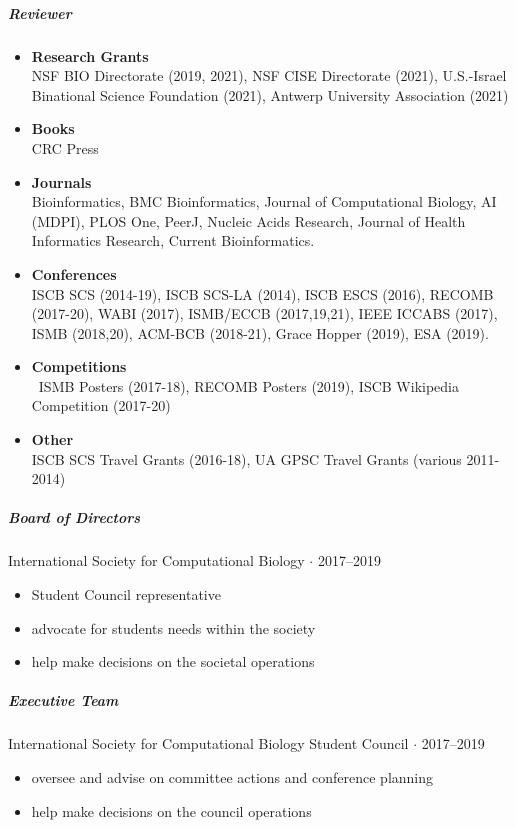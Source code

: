 \documentclass[10pt,letterpaper]{article}
\newcommand{\bigdot}{$\cdot$\xspace}
\begin{document}
\subparagraph{Reviewer} 
\begin{itemize}[leftmargin=!,labelindent=5pt,itemindent=-15pt]
    \item \textbf{Research Grants} \\ 
    	NSF BIO Directorate (2019, 2021), 
    	NSF CISE Directorate (2021), 
	U.S.-Israel Binational Science Foundation (2021), 
	Antwerp University Association (2021)
    \item \textbf{Books} \\
    	CRC Press
    \item \textbf{Journals} \\
        Bioinformatics,
        BMC Bioinformatics, 
        Journal of Computational Biology,
        AI (MDPI), 
        PLOS One, 
        PeerJ, 
        Nucleic Acids Research, 
        Journal of Health Informatics Research,
        Current Bioinformatics.
    \item \textbf{Conferences} \\
        ISCB SCS (2014-19), %
        ISCB SCS-LA (2014), %
        ISCB ESCS (2016), %
	RECOMB (2017-20), %
	WABI (2017), %
	ISMB/ECCB (2017,19,21), %
    	IEEE ICCABS (2017), %
	ISMB (2018,20), %
	ACM-BCB (2018-21), %
	Grace Hopper (2019), %
	ESA (2019). %
     \item \textbf{Competitions} \\\
     	ISMB Posters (2017-18),
	RECOMB Posters (2019), 
     	ISCB Wikipedia Competition (2017-20)
     \item \textbf{Other} \\
         ISCB SCS Travel Grants (2016-18), 
         UA GPSC Travel Grants (various 2011-2014)
\end{itemize}

\subparagraph{Board of Directors}
International Society for Computational Biology  \bigdot 2017--2019
\begin{itemize}
    \item Student Council representative 
    \item advocate for students needs within the society
    \item help make decisions on the societal operations
\end{itemize}

\subparagraph{Executive Team}
International Society for Computational Biology Student Council \bigdot 2017--2019
\begin{itemize} 
    \item oversee and advise on committee actions and conference planning 
    \item help make decisions on the council operations
\end{itemize}
\end{document}
